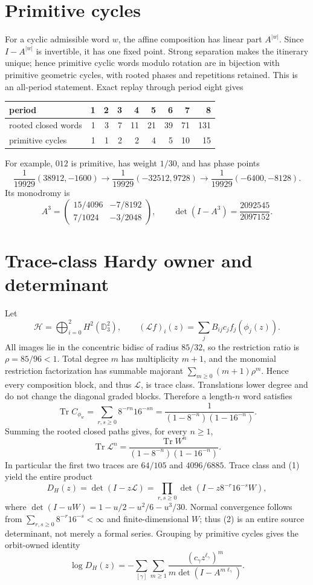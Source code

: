 \documentclass[10pt]{article}
\begin{document}
\section{Primitive cycles}
For a cyclic admissible word $w$, the affine composition has linear part
$A^{|w|}$.  Since $I-A^{|w|}$ is invertible, it has one fixed point.  Strong
separation makes the itinerary unique; hence primitive cyclic words modulo
rotation are in bijection with primitive geometric cycles, with rooted phases
and repetitions retained.  This is an all-period statement.  Exact replay
through period eight gives
\begin{center}
\begin{tabular}{@{}lrrrrrrrr@{}}
\toprule
period &1&2&3&4&5&6&7&8\\
\midrule
rooted closed words &1&3&7&11&21&39&71&131\\
primitive cycles &1&1&2&2&4&5&10&15\\
\bottomrule
\end{tabular}
\end{center}
For example, $012$ is primitive, has weight $1/30$, and has phase points
\[
\frac1{19929}(38912,-1600)\to
\frac1{19929}(-32512,9728)\to
\frac1{19929}(-6400,-8128).
\]
Its monodromy is
\[
A^3=\begin{pmatrix}15/4096&-7/8192\\7/1024&-3/2048\end{pmatrix},
\qquad \det(I-A^3)=\frac{2092545}{2097152}.
\]

\section{Trace-class Hardy owner and determinant}
Let
\[
\mathcal H=\bigoplus_{i=0}^2H^2(\mathbb D_3^2),\qquad
(\mathcal Lf)_i(z)=\sum_jB_{ij}c_j f_j(\phi_j(z)).
\]
All images lie in the concentric bidisc of radius $85/32$, so the restriction
ratio is $\rho=85/96<1$.  Total degree $m$ has multiplicity $m+1$, and the
monomial restriction factorization has summable majorant
$\sum_{m\ge0}(m+1)\rho^m$.  Hence every composition block, and thus
$\mathcal L$, is trace class.  Translations lower degree and do not change the
diagonal graded blocks.  Therefore a length-$n$ word satisfies
\[
\operatorname{Tr}C_{\phi_w}=\sum_{r,s\ge0}8^{-rn}16^{-sn}
=\frac1{(1-8^{-n})(1-16^{-n})}.
\]
Summing the rooted closed paths gives, for every $n\ge1$,
\begin{equation}
\operatorname{Tr}\mathcal L^n=
\frac{\operatorname{Tr}W^n}{(1-8^{-n})(1-16^{-n})}. \tag{1}
\end{equation}
In particular the first two traces are $64/105$ and $4096/6885$.
Trace class and (1) yield the entire product
\begin{equation}
D_H(z)=\det(I-z\mathcal L)
=\prod_{r,s\ge0}\det(I-z8^{-r}16^{-s}W), \tag{2}
\end{equation}
where
$\det(I-uW)=1-u/2-u^2/6-u^3/30$.
Normal convergence follows from
$\sum_{r,s\ge0}8^{-r}16^{-s}<\infty$ and finite-dimensional $W$; thus (2)
is an entire source determinant, not merely a formal series.
Grouping by primitive cycles gives the orbit-owned identity
\[
\log D_H(z)=-\sum_{[\gamma]}\sum_{m\ge1}
\frac{(c_\gamma z^{\ell_\gamma})^m}
{m\det(I-A^{m\ell_\gamma})}.
\]
\end{document}
